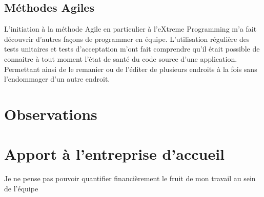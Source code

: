 \subsection{Méthodes Agiles}
L'initiation à la méthode Agile en particulier à l'eXtreme Programming m'a fait découvrir d'autres façons de programmer en équipe. L'utilisation régulière des tests unitaires et tests d'acceptation m'ont fait comprendre qu'il était possible de connaitre à tout moment l'état de santé du code source d'une application. Permettant ainsi de le remanier ou de l'éditer de plusieurs endroits à la fois sans l'endommager d'un autre endroit.

\section{Observations}

\section{Apport à l'entreprise d'accueil}
Je ne pense pas pouvoir quantifier financièrement le fruit de mon travail au sein de l'équipe